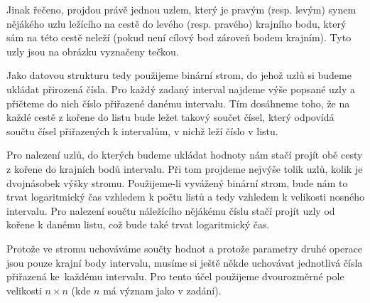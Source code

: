 \documentclass[12pt]{article}
\begin{document}
Jinak řečeno, projdou právě jednou uzlem, který je pravým (resp. levým) synem
nějákého uzlu ležícího na cestě do levého (resp. pravého) krajního
bodu, který sám na této cestě neleží (pokud není cílový bod zároveň bodem
krajním). Tyto uzly jsou na obrázku vyznačeny tečkou.

Jako datovou strukturu tedy použijeme binární strom, do jehož uzlů si budeme
ukládat přirozená čísla. Pro každý zadaný interval najdeme výše popsané uzly a
přičteme do nich číslo přiřazené danému intervalu. Tím dosáhneme toho, že na
každé cestě z kořene do listu bude ležet takový součet čísel, který odpovídá
součtu čísel přiřazených k intervalům, v nichž leží číslo v listu.

Pro nalezení uzlů, do kterých budeme ukládat hodnoty nám stačí projít obě cesty
z kořene do krajních bodů intervalu. Při tom projdeme nejvýše tolik uzlů, kolik
je dvojnásobek výšky stromu. Použijeme-li vyvážený binární strom, bude nám to
trvat logaritmický čas vzhledem k počtu listů a tedy vzhledem k velikosti
nosného intervalu.
Pro nalezení součtu náležícího nějákému číslu stačí
projít uzly od kořene k danému listu, což bude také trvat logaritmický čas.

Protože ve stromu uchováváme součty hodnot a protože parametry druhé operace
jsou pouze krajní body intervalu, musíme si ještě někde uchovávat jednotlivá
čísla přiřazená ke~každému intervalu. Pro tento účel použijeme dvourozměrné pole
velikosti $n \times n$ (kde $n$ má význam jako v zadání).

% 
% 
\end{document}

